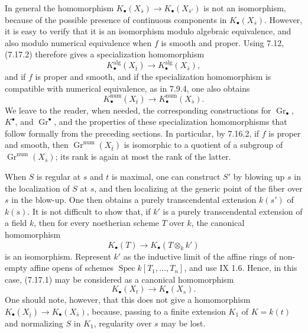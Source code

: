 \documentclass[11pt]{article}
\newcommand{\Gr}{\operatorname{Gr}}
\newcommand{\Spec}{\operatorname{Spec}}
\providecommand{\Gr}{\operatorname{Gr}}
\providecommand{\Gr}{\operatorname{G}}
\begin{document}
In general the homomorphism \(K_\bullet(X_{\bar s})\to K_\bullet(X_{\bar s'})\) is not an isomorphism, because of the possible presence of continuous components in \(K_\bullet(X_{\bar s})\). However, it is easy to verify that it is an isomorphism modulo algebraic equivalence, and also modulo numerical equivalence when \(f\) is smooth and proper. Using 7.12, (7.17.2) therefore gives a specialization homomorphism
\begin{equation}\tag{7.17.3.1}
  K^{\mathrm{alg}}_\bullet(X_{\bar t})\longrightarrow
  K^{\mathrm{alg}}_\bullet(X_{\bar s}),
\end{equation}
and if \(f\) is proper and smooth, and if the specialization homomorphism is compatible with numerical equivalence, as in 7.9.4, one also obtains
\begin{equation}\tag{7.17.3.2}
  K^{\mathrm{num}}_\bullet(X_{\bar t})\longrightarrow
  K^{\mathrm{num}}_\bullet(X_{\bar s}).
\end{equation}
We leave to the reader, when needed, the corresponding constructions for \(\Gr_\bullet\), \(K^\bullet\), and \(\Gr^\bullet\), and the properties of these specialization homomorphisms that follow formally from the preceding sections. In particular, by 7.16.2, if \(f\) is proper and smooth, then \(\Gr^{\mathrm{num}}(X_{\bar t})\) is isomorphic to a quotient of a subgroup of \(\Gr^{\mathrm{num}}(X_{\bar s})\); its rank is again at most the rank of the latter.

When \(S\) is regular at \(s\) and \(t\) is maximal, one can construct \(S'\) by blowing up \(s\) in the localization of \(S\) at \(s\), and then localizing at the generic point of the fiber over \(s\) in the blow-up. One then obtains a purely transcendental extension \(k(s')\) of \(k(s)\). It is not difficult to show that, if \(k'\) is a purely transcendental extension of a field \(k\), then for every noetherian scheme \(T\) over \(k\), the canonical homomorphism
\[
  K_\bullet(T)\longrightarrow K_\bullet(T\otimes_kk')
\]
is an isomorphism. Represent \(k'\) as the inductive limit of the affine rings of non-empty affine opens of schemes \(\Spec k[T_1,\ldots,T_n]\), and use IX 1.6. Hence, in this case, (7.17.1) may be considered as a canonical homomorphism
\begin{equation}\tag{7.17.4.1}
  K_\bullet(X_t)\longrightarrow K_\bullet(X_s).
\end{equation}
One should note, however, that this does not give a homomorphism \(K_\bullet(X_{\bar t})\to K_\bullet(X_{\bar s})\), because, passing to a finite extension \(K_1\) of \(K=k(t)\) and normalizing \(S\) in \(K_1\), regularity over \(s\) may be lost.
\end{document}
